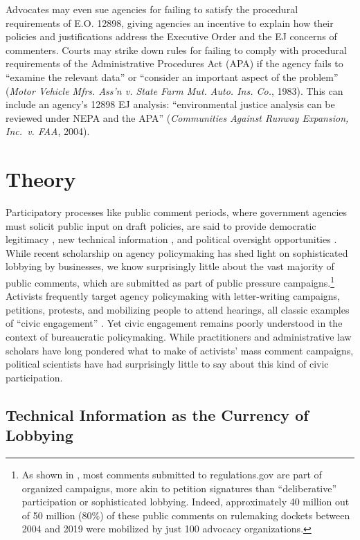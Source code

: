 \documentclass[
      12pt,
        ]{article}
\begin{document}
Advocates may even sue agencies for failing to satisfy the procedural requirements of E.O. 12898, giving agencies an incentive to explain how their policies and justifications address the Executive Order and the EJ concerns of commenters.
Courts may strike down rules for failing to comply with procedural requirements of the Administrative Procedures Act (APA) if the agency fails to ``examine the relevant data'' or ``consider an important aspect of the problem'' (\emph{Motor Vehicle Mfrs. Ass'n v. State Farm Mut. Auto. Ins. Co.}, 1983). This can include an agency's 12898 EJ analysis: ``environmental justice analysis can be reviewed under NEPA and the APA'' (\emph{Communities Against Runway Expansion, Inc.~v. FAA}, 2004).

\hypertarget{theory}{%
\section{Theory}\label{theory}}

Participatory processes like public comment periods, where government
agencies must solicit public input on draft policies, are said to provide democratic legitimacy \citep{Croley2003, Rosenbloom2003}, new technical information \citep{Yackee2006JPART, Nelson2012}, and political oversight opportunities \citep{Balla1998, Mccubbins1984}. While recent scholarship on agency policymaking has shed light on sophisticated lobbying by businesses, we know surprisingly little about the vast majority of public comments, which are submitted as part of public pressure campaigns.\footnote{
  As shown in \citet{judgelord2019SPSA}, most comments submitted to
  regulations.gov are part of organized campaigns, more akin to petition signatures than ``deliberative'' participation or sophisticated lobbying. Indeed, approximately 40 million out of
  50 million (80\%) of these public comments on rulemaking dockets between 2004 and 2019 were mobilized by just 100
  advocacy organizations.}
Activists frequently target agency policymaking with letter-writing campaigns, petitions, protests,
and mobilizing people to attend hearings, all classic examples of ``civic engagement'' \citep{Verba1987}. Yet civic engagement remains poorly understood in the context of bureaucratic policymaking.
While practitioners and administrative law scholars have long pondered
what to make of activists' mass comment campaigns, political scientists have had
surprisingly little to say about this kind of civic participation.

\hypertarget{technical-information-as-the-currency-of-lobbying}{%
\subsection{Technical Information as the Currency of Lobbying}\label{technical-information-as-the-currency-of-lobbying}}
\end{document}
